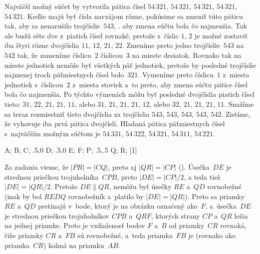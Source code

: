 {%
Najväčší možný súčet by vytvorila pätica čísel $54\,321$, $54\,321$,
$54\,321$, $54\,321$, $54\,321$. Keďže majú byť čísla navzájom rôzne,
pokúsime sa zmeniť túto päticu tak, aby sa nenarušilo trojčíslie~$543$,
\tj. aby zmena súčtu bola čo najmenšia. Tak ale budú ešte
dve z~piatich čísel rovnaké, pretože z~číslic $1$, $2$ je možné zostaviť
iba štyri rôzne dvojčíslia $11$, $12$, $21$, $22$. Zmeníme preto jedno
trojčíslie~$543$ na $542$ tak, že zameníme číslicu~$2$ číslicou~$3$ na
mieste desiatok. Rovnako tak na mieste jednotiek nemôže byť všetkých päť
jednotiek, pretože by posledné trojčíslie najmenej troch päťmiestnych
čísel bolo~$321$. Vymeníme preto číslicu~$1$ z~miesta jednotiek
s~číslicou~$2$ z~miesta stoviek a~to preto, aby zmena súčtu pätice
čísel bola čo najmenšia. Po týchto výmenách môžu byť posledné
dvojčíslia piatich čísel tieto: $31$, $22$, $21$, $21$, $11$, alebo $31$, $21$, $21$,
$21$, $12$, alebo $32$, $21$, $21$, $21$, $11$. Snažíme sa teraz rozmiestniť tieto
dvojčíslia za trojčíslia $543$, $543$, $543$, $543$, $542$. Zistíme, že
vyhovuje iba prvá pätica dvojčíslí. Hľadaná pätica
päťmiestnych čísel s~najväčším možným súčtom je  $54\,331$, $54\,322$,
$54\,321$, $54\,311$, $54\,221$.}

{%
\fontplace
\tpoint A; \tpoint B; \bpoint C;
\bpoint\xy.5,0 D; \tpoint\xy.5,0 E; \bpoint F;
\rtpoint P; \rBpoint\xy.5,.5 Q; \rpoint R;
[1]
\hfil\Obr

Zo zadania vieme, že $|PR|=|CQ|$, preto aj $|QR|=|CP|$ (\obr).
Úsečka~$DE$ je strednou priečkou trojuholníka~$CPB$, preto
\inspicture{}
$|DE|=|CP|/2$, a teda tiež $|DE|=|QR|/2$. Pretože $DE \parallel QR$, nemôžu byť
úsečky $RE$ a~$QD$ rovnobežné (inak by bol $REDQ$ rovnobežník
a~platilo by $|DE|=|QR|$). Preto sa priamky $RE$ a~$QD$ pretínajú
v~bode, ktorý je na obrázku označený ako~$F$, a~úsečka~$DE$ je
strednou priečkou trojuholníkov $CPB$ a~$QRF$, ktorých strany $CP$ 
a~$QR$ ležia na jednej priamke. Preto je vzdialenosť bodov $F$ a~$B$ od
priamky~$CR$ rovnaká, čiže priamky $CR$ a~$FB$ sú rovnobežné, 
a~teda priamka~$FB$ je (rovnako ako priamka~$CR$) kolmá na priamku~$AB$.}

